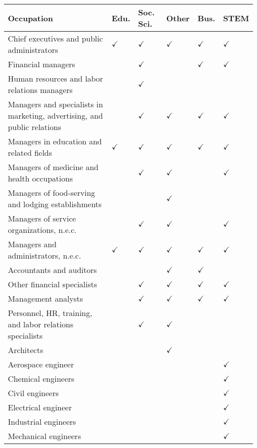 

\begin{tabular}[t]{llllll}
\toprule
Occupation & Edu. & Soc. Sci. & Other & Bus. & STEM\\
\midrule
Chief executives and public administrators & $\checkmark$ & $\checkmark$ & $\checkmark$ & $\checkmark$ & $\checkmark$\\
Financial managers &  & $\checkmark$ &  & $\checkmark$ & $\checkmark$\\
Human resources and labor relations managers &  & $\checkmark$ &  &  & \\
Managers and specialists in marketing, advertising, and public relations &  & $\checkmark$ & $\checkmark$ & $\checkmark$ & $\checkmark$\\
Managers in education and related fields & $\checkmark$ & $\checkmark$ & $\checkmark$ & $\checkmark$ & $\checkmark$\\
Managers of medicine and health occupations &  & $\checkmark$ & $\checkmark$ &  & $\checkmark$\\
Managers of food-serving and lodging establishments &  &  & $\checkmark$ &  & \\
Managers of service organizations, n.e.c. &  & $\checkmark$ & $\checkmark$ &  & $\checkmark$\\
Managers and administrators, n.e.c. & $\checkmark$ & $\checkmark$ & $\checkmark$ & $\checkmark$ & $\checkmark$\\
Accountants and auditors &  &  & $\checkmark$ & $\checkmark$ & \\
Other financial specialists &  & $\checkmark$ & $\checkmark$ & $\checkmark$ & $\checkmark$\\
Management analysts &  & $\checkmark$ & $\checkmark$ & $\checkmark$ & $\checkmark$\\
Personnel, HR, training, and labor relations specialists &  & $\checkmark$ & $\checkmark$ &  & \\
Architects &  &  & $\checkmark$ &  & \\
Aerospace engineer &  &  &  &  & $\checkmark$\\
Chemical engineers &  &  &  &  & $\checkmark$\\
Civil engineers &  &  &  &  & $\checkmark$\\
Electrical engineer &  &  &  &  & $\checkmark$\\
Industrial engineers &  &  &  &  & $\checkmark$\\
Mechanical engineers &  &  &  &  & $\checkmark$\\

\end{tabular}

